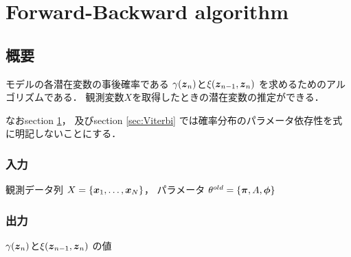 \section{Forward-Backward algorithm}
\label{sec:Forward-Backward}
\subsection{概要}
\label{sec:Forward-Backward:abst}
モデルの各潜在変数の事後確率である
$\gamma(\mbox{\boldmath $z$}_n)$と$\xi(\mbox{\boldmath $z$}_{n-1},\mbox{\boldmath $z$}_n)$
を求めるためのアルゴリズムである．
観測変数$X$を取得したときの潜在変数の推定ができる．

なおsection \ref{sec:Forward-Backward}，
及びsection \ref{sec:Viterbi}
では確率分布のパラメータ依存性を式に明記しないことにする．
\subsubsection{入力}
\label{sec:Forward-Backward:input}
観測データ列 $X=\{\mbox{\boldmath $x$}_1,\dots,\mbox{\boldmath $x$}_N\}$，
パラメータ $\theta^{old} = \{\mbox{\boldmath $\pi$}, A, \mbox{\boldmath $\phi$}\}$
\subsubsection{出力}
\label{sec:Forward-Backward:output}
$\gamma(\mbox{\boldmath $z$}_n)$と$\xi(\mbox{\boldmath $z$}_{n-1},\mbox{\boldmath $z$}_n)$
の値
